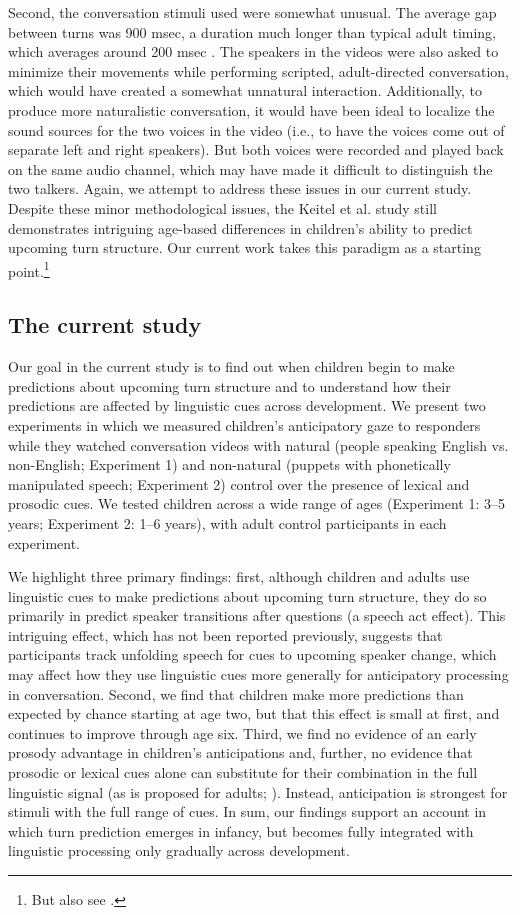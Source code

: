 \documentclass[authoryear, 12pt]{elsarticle}
\begin{document}
Second, the conversation stimuli \citet{keitel2013} used were somewhat unusual. The average gap between turns was 900 msec, a duration much longer than typical adult timing, which averages around 200 msec \citep{stivers2009}. The speakers in the videos were also asked to minimize their movements while performing scripted, adult-directed conversation, which would have created a somewhat unnatural interaction. Additionally, to produce more naturalistic conversation, it would have been ideal to localize the sound sources for the two voices in the video (i.e., to have the voices come out of separate left and right speakers). But both voices were recorded and played back on the same audio channel, which may have made it difficult to distinguish the two talkers. Again, we attempt to address these issues in our current study. Despite these minor methodological issues, the Keitel et al. \citeyearpar{keitel2013} study still demonstrates intriguing age-based differences in children's ability to predict upcoming turn structure. Our current work takes this paradigm as a starting point.\footnote{But also see \citet{casillas2012, casillas2013}.} 

\subsection{The current study}

Our goal in the current study is to find out when children begin to make predictions about upcoming turn structure and to understand how their predictions are affected by linguistic cues across development. We present two experiments in which we measured children's anticipatory gaze to responders while they watched conversation videos with natural (people speaking English vs. non-English; Experiment 1) and non-natural (puppets with phonetically manipulated speech; Experiment 2) control over the presence of lexical and prosodic cues. We tested children across a wide range of ages (Experiment 1: 3--5 years; Experiment 2: 1--6 years), with adult control participants in each experiment.

We highlight three primary findings: first, although children and adults use linguistic cues to make predictions about upcoming turn structure, they do so primarily in predict speaker transitions after questions (a speech act effect). This intriguing effect, which has not been reported previously, suggests that participants track unfolding speech for cues to upcoming speaker change, which may affect how they use linguistic cues more generally for anticipatory processing in conversation. Second, we find that children make more predictions than expected by chance starting at age two, but that this effect is small at first, and continues to improve through age six. Third, we find no evidence of an early prosody advantage in children's anticipations and, further, no evidence that prosodic or lexical cues alone can substitute for their combination in the full linguistic signal (as is proposed for adults; \citealp{de-ruiter2006}). Instead, anticipation is strongest for stimuli with the full range of cues. In sum, our findings support an account in which turn prediction emerges in infancy, but becomes fully integrated with linguistic processing only gradually across development.
\end{document}
